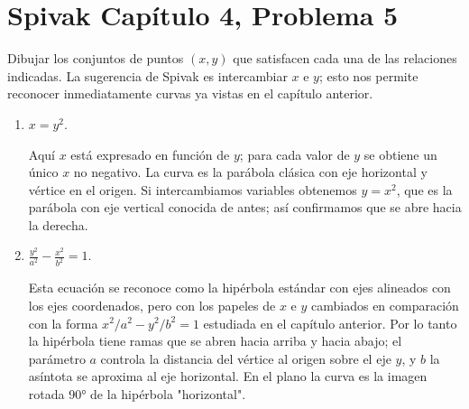 \section*{Spivak Capítulo 4, Problema 5}

Dibujar los conjuntos de puntos $(x,y)$ que satisfacen cada una de las
relaciones indicadas. La sugerencia de Spivak es intercambiar $x$ e $y$;
esto nos permite reconocer inmediatamente curvas ya vistas en el capítulo
anterior.

\begin{enumerate}[label=(\roman*)]
\item $x=y^{2}$.

  Aquí $x$ está expresado en función de $y$; para cada valor de $y$ se
  obtiene un único $x$ no negativo. La curva es la parábola clásica con
  eje horizontal y vértice en el origen. Si intercambiamos variables
  obtenemos $y=x^{2}$, que es la parábola con eje vertical conocida de
  antes; así confirmamos que se abre hacia la derecha.

  \begin{center}
  \end{center}

\item $\displaystyle\frac{y^{2}}{a^{2}}-\frac{x^{2}}{b^{2}}=1$.

  Esta ecuación se reconoce como la hipérbola estándar con ejes alineados
  con los ejes coordenados, pero con los papeles de $x$ e $y$ cambiados en
  comparación con la forma $x^{2}/a^{2}-y^{2}/b^{2}=1$ estudiada en el
  capítulo anterior. Por lo tanto la hipérbola tiene ramas que se abren
  hacia arriba y hacia abajo; el parámetro $a$ controla la distancia del
  vértice al origen sobre el eje $y$, y $b$ la asíntota se aproxima al
  eje horizontal. En el plano la curva es la imagen rotada 90° de la
  hipérbola "horizontal".

  \begin{center}
  \end{center}


\end{enumerate}
